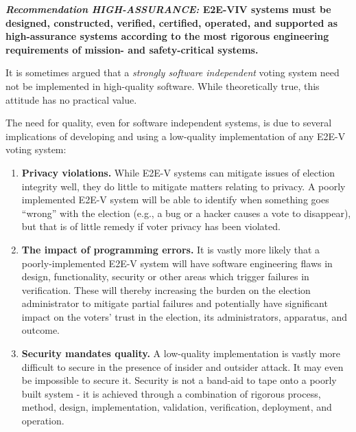 \begin{center}
  \textbf{\emph{Recommendation HIGH-ASSURANCE:} E2E-VIV systems must
    be designed, constructed, verified, certified, operated, and
    supported as high-assurance systems according to the most rigorous
    engineering requirements of mission- and safety-critical systems.}
\end{center}

It is sometimes argued that a \emph{strongly software independent}
voting system need not be implemented in high-quality software. While
theoretically true, this attitude has no practical value. 

The need for quality, even for software independent systems, is due to
several implications of developing and using a low-quality
implementation of any E2E-V voting system:
\begin{enumerate}
\item \textbf{Privacy violations.} While E2E-V systems can mitigate
  issues of election integrity well, they do little to mitigate
  matters relating to privacy. A poorly implemented E2E-V system will
  be able to identify when something goes ``wrong'' with the election
  (e.g., a bug or a hacker causes a vote to disappear), but that is of
  little remedy if voter privacy has been violated.
\item \textbf{The impact of programming errors.} It is vastly more
  likely that a poorly-implemented E2E-V system will have software
  engineering flaws in design, functionality, security or other areas
  which trigger failures in verification. These will thereby
  increasing the burden on the election administrator to mitigate
  partial failures and potentially have significant impact on the
  voters' trust in the election, its administrators, apparatus, and
  outcome.
\item \textbf{Security mandates quality.} A low-quality implementation
  is vastly more difficult to secure in the presence of insider and
  outsider attack. It may even be impossible to secure it. Security is
  not a band-aid to tape onto a poorly built system - it is achieved
  through a combination of rigorous process, method, design,
  implementation, validation, verification, deployment, and operation.
\end{enumerate}

